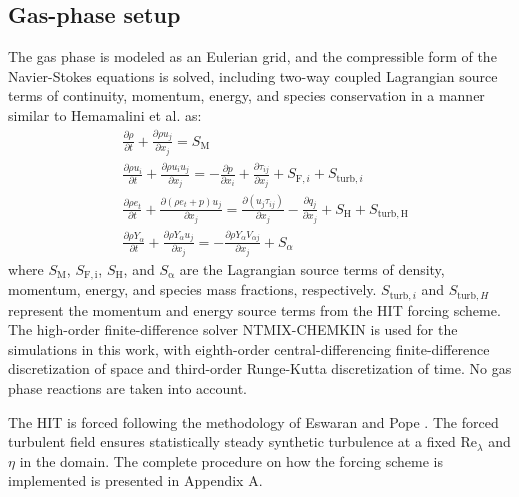 \documentclass[times,twocolumn,final]{elsarticle}
\newcommand{\mrm}[1]{\mathrm{#1}}
\newcommand{\Rel}{\mathrm{Re}_\lambda}
\newcommand{\YO}{Y_\mathrm{O_2}}
\newcommand{\red}{\color{red}}
\newcommand{\red}{}
\begin{document}
{ \red
\subsection{Gas-phase setup\label{sec:gasphase}}

The gas phase is modeled as an Eulerian grid, and the compressible form of the Navier-Stokes equations is solved, including two-way coupled Lagrangian source terms of continuity, momentum, energy, and species conservation in a manner similar to Hemamalini et al. \cite{Hemamalini2024} as:
\begin{align}
    & \frac{\partial \rho}{\partial t} + \frac{\partial \rho u_j}{\partial x_j} = S_\mrm{M} \label{eq:mass} \\
    & \frac{\partial \rho u_i}{\partial t} + \frac{\partial \rho u_i u_j}{\partial x_j} = -\frac{\partial p}{\partial x_i} + \frac{\partial \tau_{ij}}{\partial x_j} + S_{\mrm{F},i} + S_{\mrm{turb},i} \label{eq:momentum} \\
    & \frac{\partial \rho e_t}{\partial t} + \frac{\partial (\rho e_t + p)u_j}{\partial x_j} = \frac{\partial (u_j \tau_{ij})}{\partial x_j} - \frac{\partial q_j}{\partial x_j} + S_\mrm{H} + S_{\mrm{turb,H}} \label{eq:energy} \\
    & \frac{\partial \rho Y_\alpha}{\partial t} + \frac{\partial \rho Y_\alpha u_j}{\partial x_j} = -\frac{\partial \rho Y_\alpha V_{\alpha j}}{\partial x_j} + S_\alpha \label{eq:species}
\end{align}
\noindent where $S_\mrm{M}$, $S_\mrm{F,i}$, $S_\mrm{H}$, and $S_\mrm{\alpha}$ are the Lagrangian source terms of density, momentum, energy, and species mass fractions, respectively. $S_{\mrm{turb},i}$ and $S_{\mrm{turb},H}$ represent the momentum and energy source terms from the HIT forcing scheme. The high-order finite-difference solver NTMIX-CHEMKIN \cite{poinsot1992boundary} is used for the simulations in this work, with eighth-order central-differencing finite-difference discretization of space and third-order Runge-Kutta discretization of time. No gas phase reactions are taken into account. 

The HIT is forced following the methodology of Eswaran and Pope \cite{Eswaran1988}. The forced turbulent field ensures statistically steady synthetic turbulence at a fixed $\Rel$ and $\eta$ in the domain. The complete procedure on how the forcing scheme is implemented is presented in Appendix A.

}
\end{document}
